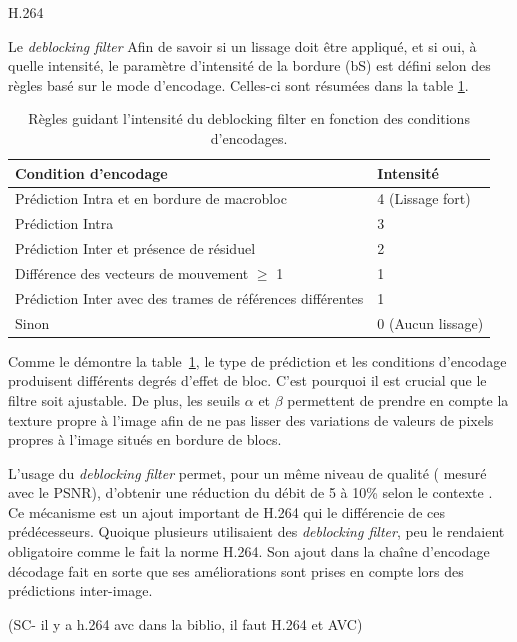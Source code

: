 \documentclass{article}
\begin{document}
\begin{section}{H.264}
\begin{subsection}{Le \textit{deblocking filter}}
Afin de savoir si un lissage doit être appliqué, et si oui, à quelle
intensité, le paramètre d'intensité de la bordure (bS) est défini selon des
règles basé sur le mode d'encodage. Celles-ci sont résumées dans la table
\ref{tab-FilteringRules}.

\begin{table}[htb]
\caption{Règles guidant l'intensité du deblocking filter en fonction des
conditions d'encodages.}
\label{tab-FilteringRules}
\vspace{1em}
\centering
\begin{tabular}{ l l }
 \hline
 Condition d'encodage & Intensité \\
 \hline   
 Prédiction Intra et en bordure de macrobloc & 4 (Lissage fort)\\
 Prédiction Intra & 3 \\
 Prédiction Inter et présence de résiduel & 2 \\
 Différence des vecteurs de mouvement $\geqslant$ 1 & 1 \\
 Prédiction Inter avec des trames de références différentes& 1 \\
 Sinon & 0 (Aucun lissage) \\ 
 \hline   
\end{tabular}
\end{table}

Comme le démontre la table~\ref{tab-FilteringRules}, le type de
prédiction et les conditions d'encodage produisent différents degrés d'effet
de bloc. C'est pourquoi il est crucial que le filtre soit ajustable. De plus,
les seuils $\alpha$ et $\beta$ permettent de prendre en compte la texture propre
à l'image afin de ne pas lisser des variations de valeurs de pixels propres à
l'image situés en bordure de blocs.

L'usage du \textit{deblocking filter} permet, pour un même niveau de qualité (
mesuré avec le PSNR), d'obtenir une réduction du débit de 5 à 10\% selon le
contexte \cite{list2003}. Ce mécanisme est un ajout important de H.264 qui
le différencie de ces prédécesseurs. Quoique plusieurs utilisaient des
\textit{deblocking filter}, peu le rendaient obligatoire comme le fait la norme
H.264. Son ajout dans la chaîne d'encodage décodage fait en sorte que ses
améliorations sont prises en compte lors des prédictions inter-image.
\end{subsection}



(SC- il y a h.264 avc dans la biblio, il faut H.264 et AVC)
\end{section}
\end{document}
